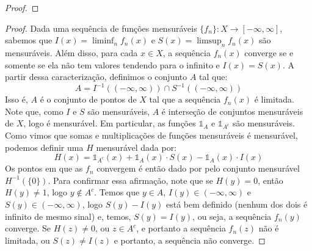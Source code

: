 \begin{proof}
\end{proof}

\begin{problem}
\label{prob:l1:2}
\end{problem}

\begin{proof}
    Dada uma sequência de funções mensuráveis $\{f_n\} : X \to [-\infty, \infty]$, sabemos que $I(x) = \liminf_n f_n(x)$ e $S(x) = \limsup_n f_n(x)$ são mensuráveis.
    Além disso, para cada $x \in X$, a sequência $f_n(x)$ converge se e somente se ela não tem valores tendendo para o infinito e $I(x) = S(x)$.
    A partir dessa caracterização, definimos o conjunto $A$ tal que:
    $$A = I^{-1}((-\infty, \infty)) \cap S^{-1}((-\infty, \infty))$$
    Isso é, $A$ é o conjunto de pontos de $X$ tal que a sequência $f_n(x)$ é limitada. Note que, como $I$ e $S$ são mensuráveis, $A$ é interseção
    de conjuntos mensuráveis de $X$, logo é mensurável. Em particular, as funções $\mathds{1}_A$ e $\mathds{1}_{A^c}$ são mensuráveis. Como vimos que somas e multiplicações
    de funções mensuráveis é mensurável, podemos definir uma $H$ mensurável dada por:
    $$H(x) = \mathds{1}_{A^c}(x) + \mathds{1}_A(x) \cdot S(x) - \mathds{1}_A(x) \cdot I(x) $$
    Os pontos em que as $f_n$ convergem é então dado por pelo conjunto mensurável $H^{-1}(\{0\})$. Para confirmar essa afirmação, note que
    se $H(y) = 0$, então $H(y) \neq 1$, logo $y \not \in A^c$. Temos que $y \in A$, $I(y) \in (-\infty,\infty)$ e $S(y) \in (-\infty, \infty)$, 
    logo $S(y) - I(y)$ está bem definido (nenhum dos dois é infinito de mesmo sinal) e, temos, $S(y) = I(y)$, ou seja, a sequência $f_n(y)$ converge.
    Se $H(z) \neq 0$, ou $z \in A^c$, e portanto a sequência $f_n(z)$ não é limitada, ou $S(z) \neq I(z)$ e portanto, a sequência não converge.  
\end{proof}

